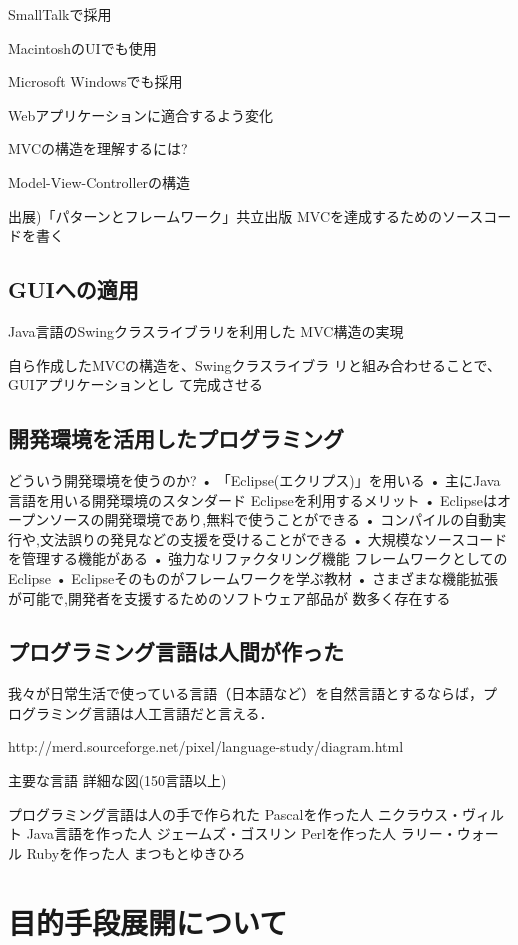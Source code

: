 \documentclass[a4j,papersize]{jsbook}
\begin{document}
SmallTalkで採用

MacintoshのUIでも使用

Microsoft Windowsでも採用

Webアプリケーションに適合するよう変化

MVCの構造を理解するには?

Model-View-Controllerの構造

出展)「パターンとフレームワーク」共立出版
MVCを達成するためのソースコードを書く

\subsection{GUIへの適用}
Java言語のSwingクラスライブラリを利用した
MVC構造の実現

自ら作成したMVCの構造を、Swingクラスライブラ
リと組み合わせることで、GUIアプリケーションとし
て完成させる

\subsection{開発環境を活用したプログラミング}
どういう開発環境を使うのか?
• 「Eclipse(エクリプス)」を用いる
• 主にJava言語を用いる開発環境のスタンダード
Eclipseを利用するメリット
• Eclipseはオープンソースの開発環境であり,無料で使うことができる
• コンパイルの自動実行や,文法誤りの発見などの支援を受けることができる
• 大規模なソースコードを管理する機能がある
• 強力なリファクタリング機能
フレームワークとしてのEclipse
• Eclipseそのものがフレームワークを学ぶ教材
• さまざまな機能拡張が可能で,開発者を支援するためのソフトウェア部品が
数多く存在する

\subsection{プログラミング言語は人間が作った}

我々が日常生活で使っている言語（日本語など）を自然言語とするならば，プ
ログラミング言語は人工言語だと言える．

http://merd.sourceforge.net/pixel/language-study/diagram.html

 主要な言語
 詳細な図(150言語以上)

プログラミング言語は人の手で作られた
 Pascalを作った人
 ニクラウス・ヴィルト
 Java言語を作った人
 ジェームズ・ゴスリン
 Perlを作った人
 ラリー・ウォール
 Rubyを作った人
 まつもとゆきひろ
\section{目的手段展開について}
\end{document}
